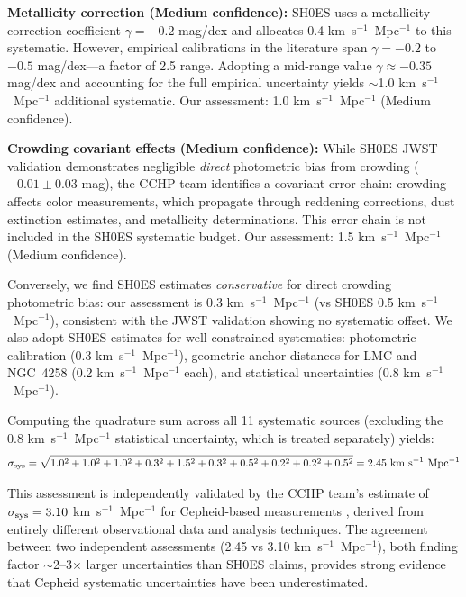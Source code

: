 \documentclass[twocolumn, linenumbers]{aastex701}
\begin{document}
\textbf{Metallicity correction (Medium confidence):} SH0ES uses a metallicity correction coefficient $\gamma = -0.2$ mag/dex and allocates 0.4 km~s$^{-1}$~Mpc$^{-1}$ to this systematic. However, empirical calibrations in the literature span $\gamma = -0.2$ to $-0.5$ mag/dex---a factor of 2.5 range. Adopting a mid-range value $\gamma \approx -0.35$ mag/dex and accounting for the full empirical uncertainty yields $\sim$1.0 km~s$^{-1}$~Mpc$^{-1}$ additional systematic. Our assessment: 1.0 km~s$^{-1}$~Mpc$^{-1}$ (Medium confidence).

\textbf{Crowding covariant effects (Medium confidence):} While SH0ES JWST validation \citep{Riess2024JWST} demonstrates negligible \textit{direct} photometric bias from crowding ($-0.01 \pm 0.03$ mag), the CCHP team \citep{Freedman2024} identifies a covariant error chain: crowding affects color measurements, which propagate through reddening corrections, dust extinction estimates, and metallicity determinations. This error chain is not included in the SH0ES systematic budget. Our assessment: 1.5 km~s$^{-1}$~Mpc$^{-1}$ (Medium confidence).

Conversely, we find SH0ES estimates \textit{conservative} for direct crowding photometric bias: our assessment is 0.3 km~s$^{-1}$~Mpc$^{-1}$ (vs SH0ES 0.5 km~s$^{-1}$~Mpc$^{-1}$), consistent with the JWST validation showing no systematic offset. We also adopt SH0ES estimates for well-constrained systematics: photometric calibration (0.3 km~s$^{-1}$~Mpc$^{-1}$), geometric anchor distances for LMC and NGC~4258 (0.2 km~s$^{-1}$~Mpc$^{-1}$ each), and statistical uncertainties (0.8 km~s$^{-1}$~Mpc$^{-1}$).

Computing the quadrature sum across all 11 systematic sources (excluding the 0.8 km~s$^{-1}$~Mpc$^{-1}$ statistical uncertainty, which is treated separately) yields:
\begin{equation}
\sigma_{\rm sys} = \sqrt{1.0^2 + 1.0^2 + 1.0^2 + 0.3^2 + 1.5^2 + 0.3^2 + 0.5^2 + 0.2^2 + 0.2^2 + 0.5^2} = 2.45~{\rm km~s^{-1}~Mpc^{-1}}
\end{equation}

This assessment is independently validated by the CCHP team's estimate of $\sigma_{\rm sys} = 3.10$ km~s$^{-1}$~Mpc$^{-1}$ for Cepheid-based measurements \citep{Freedman2024}, derived from entirely different observational data and analysis techniques. The agreement between two independent assessments (2.45 vs 3.10 km~s$^{-1}$~Mpc$^{-1}$), both finding factor $\sim$2--3$\times$ larger uncertainties than SH0ES claims, provides strong evidence that Cepheid systematic uncertainties have been underestimated.
\end{document}
